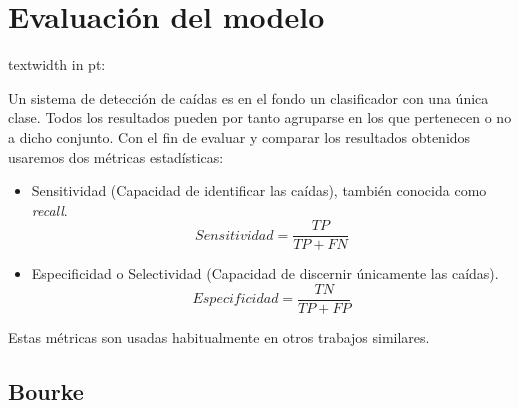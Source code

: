 \documentclass[../tfm.tex]{subfiles}
\begin{document}

\section{Evaluación del modelo}
textwidth in pt: \the\textwidth


Un sistema de detección de caídas es en el fondo un clasificador con una única clase. Todos los resultados pueden por tanto agruparse en los que pertenecen o no a dicho conjunto. Con el fin de evaluar y comparar los resultados obtenidos usaremos dos métricas estadísticas:
\begin{itemize}
  \item Sensitividad (Capacidad de identificar las caídas), también conocida como \textit{recall}.
  \[
    Sensitividad = \frac{TP}{TP+FN}
  \]
  \item Especificidad o Selectividad (Capacidad de discernir únicamente las caídas).
  \[
    Especificidad = \frac{TN}{TP+FP}
  \]
\end{itemize}

Estas métricas son usadas habitualmente en otros trabajos similares\cite{Noury2007,Chen2005, Bourke2006}.

\subsection{Bourke}
\end{document}
